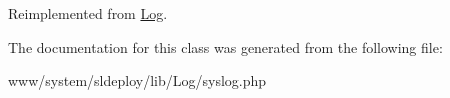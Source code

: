 Reimplemented from \hyperlink{class_log_a44a2ac59a3b91f8c18905dce700934d6}{Log}.



The documentation for this class was generated from the following file:\begin{DoxyCompactItemize}
\item 
www/system/sldeploy/lib/Log/syslog.php\end{DoxyCompactItemize}
